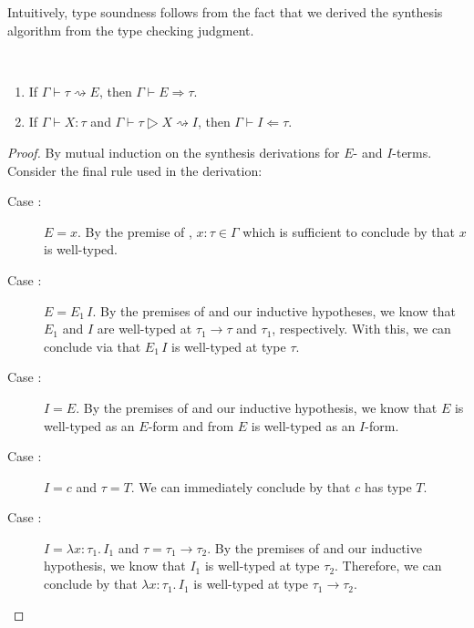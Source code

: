 Intuitively, type soundness follows from the fact that we derived the synthesis algorithm from the type checking judgment.
\begin{lemma}\ %
  \begin{enumerate}
    \item If $Γ ⊢ τ ⇝ E$, then $Γ ⊢ E ⇒ τ$.
    \item If $Γ ⊢ Χ : τ$ and $Γ ⊢ τ ▷ Χ ⇝ I$, then $Γ ⊢ I ⇐ τ$.
  \end{enumerate}
\end{lemma}
\begin{proof}
  By mutual induction on the synthesis derivations for $E$- and $I$-terms.
  Consider the final rule used in the derivation:
  \begin{description}
    \item[Case :]
      $E = x$.
      By the premise of , $x{:}τ ∈ Γ$ which is sufficient to conclude by  that $x$ is well-typed.
    \item[Case :]
      $E = E_1\,I$.
      By the premises of  and our inductive hypotheses, we know that $E_1$ and $I$ are well-typed at $τ_1 → τ$ and $τ_1$, respectively.
      With this, we can conclude via  that $E_1\,I$ is well-typed at type $τ$.
    \item[Case :]
      $I = E$.
      By the premises of  and our inductive hypothesis, we know that $E$ is well-typed as an $E$-form and from  $E$ is well-typed as an $I$-form.
    \item[Case :]
      $I = c$ and $τ = T$.
      We can immediately conclude by  that $c$ has type $T$.
    \item[Case :]
      $I = λx{:}τ_1.\,I_1$ and $τ = τ_1 → τ_2$.
      By the premises of  and our inductive hypothesis, we know that $I_1$ is well-typed at type $τ_2$.
      Therefore, we can conclude by  that $λx{:}τ_1.\,I_1$ is well-typed at type $τ_1 → τ_2$.
  \end{description}
\end{proof}

